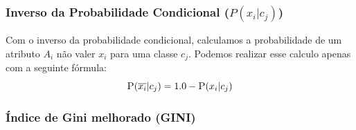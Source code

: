 \subsubsection{Inverso da Probabilidade Condicional ($P(x_i|c_j)$)}
\label{subsubsection::pc'}
Com o inverso da probabilidade condicional, calculamos a probabilidade de um atributo $A_i$ não valer $x_i$ para uma classe $c_j$. Podemos realizar esse calculo apenas com a seguinte fórmula:
\begin{equation}\label{eqn::plinhattalquec}
 \textsc{P}(\overline{x_i}|c_j) = 1.0 - \textsc{P}(x_i|c_j)
\end{equation}

\subsubsection{Índice de Gini melhorado (GINI)}
\label{subsubsection::gini}

